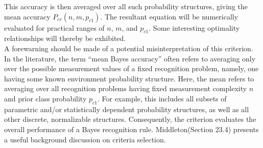 \documentclass[10pt, a4paper]{article}
\begin{document}
\begin{CJK*}{UTF8}{bsmi}
\begin{multicols}{2}
This accuracy is then averaged over all such probability structures, giving the mean accuracy $P_{cr}(n, m, p_{c1})$. 
The resultant equation will be numerically evaluated for practical ranges of $n$, $m$, and $p_{c1}$. 
Some interesting optimality relationships will thereby be exhibited.\\
\hspace{1em} A forewarning should be made of a potential misinterpretation of this criterion. 
In the literature, the term “mean Bayes accuracy” often refers to averaging only over the possible measurement values of a fixed recognition problem, namely, one having some known environment probability structure. 
Here, the mean refers to averaging over all recognition problems having fixed measurement complexity $n$ and prior class probability $p_{c1}$. 
For example, this includes all subsets of parametric and/or statistically dependent probability structures, as well as all other discrete, normalizable structures. 
Consequently, the criterion evaluates the overall performance of a Bayes recognition rule. 
Middleton(Section 23.4) presents a useful background discussion on criteria selection.\\


\end{multicols}
\end{CJK*}
\end{document}
